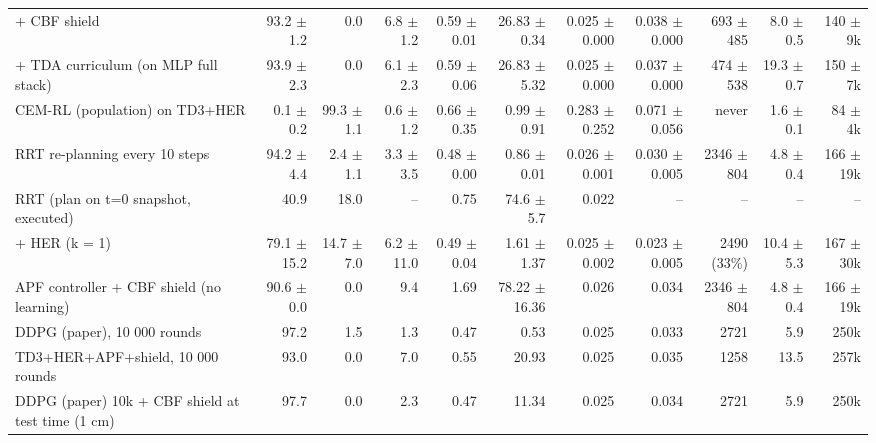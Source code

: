 \begin{table}[t]
\begin{tabular}{lrrrrrrrrrr}
+ CBF shield & 93.2 $\pm$ 1.2 & 0.0 & 6.8 $\pm$ 1.2 & 0.59 $\pm$ 0.01 & 26.83 $\pm$ 0.34 & 0.025 $\pm$ 0.000 & 0.038 $\pm$ 0.000 & 693 $\pm$ 485 & 8.0 $\pm$ 0.5 & 140 $\pm$ 9k \\
+ TDA curriculum (on MLP full stack) & 93.9 $\pm$ 2.3 & 0.0 & 6.1 $\pm$ 2.3 & 0.59 $\pm$ 0.06 & 26.83 $\pm$ 5.32 & 0.025 $\pm$ 0.000 & 0.037 $\pm$ 0.000 & 474 $\pm$ 538 & 19.3 $\pm$ 0.7 & 150 $\pm$ 7k \\
CEM-RL (population) on TD3+HER & 0.1 $\pm$ 0.2 & 99.3 $\pm$ 1.1 & 0.6 $\pm$ 1.2 & 0.66 $\pm$ 0.35 & 0.99 $\pm$ 0.91 & 0.283 $\pm$ 0.252 & 0.071 $\pm$ 0.056 & never & 1.6 $\pm$ 0.1 & 84 $\pm$ 4k \\
RRT re-planning every 10 steps & 94.2 $\pm$ 4.4 & 2.4 $\pm$ 1.1 & 3.3 $\pm$ 3.5 & 0.48 $\pm$ 0.00 & 0.86 $\pm$ 0.01 & 0.026 $\pm$ 0.001 & 0.030 $\pm$ 0.005 & 2346 $\pm$ 804 & 4.8 $\pm$ 0.4 & 166 $\pm$ 19k \\
RRT (plan on t=0 snapshot, executed) & 40.9 & 18.0 & -- & 0.75 & 74.6 $\pm$ 5.7 & 0.022 & -- & -- & -- & -- \\
+ HER (k = 1) & 79.1 $\pm$ 15.2 & 14.7 $\pm$ 7.0 & 6.2 $\pm$ 11.0 & 0.49 $\pm$ 0.04 & 1.61 $\pm$ 1.37 & 0.025 $\pm$ 0.002 & 0.023 $\pm$ 0.005 & 2490 (33\%) & 10.4 $\pm$ 5.3 & 167 $\pm$ 30k \\
APF controller + CBF shield (no learning) & 90.6 $\pm$ 0.0 & 0.0 & 9.4 & 1.69 & 78.22 $\pm$ 16.36 & 0.026 & 0.034 & 2346 $\pm$ 804 & 4.8 $\pm$ 0.4 & 166 $\pm$ 19k \\
DDPG (paper), 10 000 rounds & 97.2 & 1.5 & 1.3 & 0.47 & 0.53 & 0.025 & 0.033 & 2721 & 5.9 & 250k \\
TD3+HER+APF+shield, 10 000 rounds & 93.0 & 0.0 & 7.0 & 0.55 & 20.93 & 0.025 & 0.035 & 1258 & 13.5 & 257k \\
DDPG (paper) 10k + CBF shield at test time (1 cm) & 97.7 & 0.0 & 2.3 & 0.47 & 11.34 & 0.025 & 0.034 & 2721 & 5.9 & 250k \\
\bottomrule
\end{tabular}
\end{table}